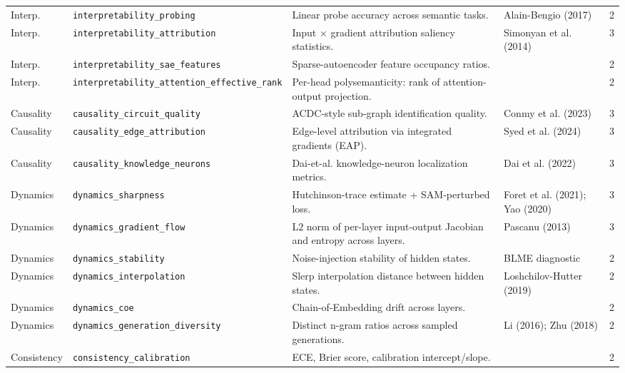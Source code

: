 \documentclass[preprint]{neurips_2025}
\begin{document}
\begin{longtable}{@{}llp{7.3cm}ll@{}}
Interp. & \texttt{interpretability\_probing} & Linear probe accuracy across semantic tasks. & Alain-Bengio (2017) & 2 \\
Interp. & \texttt{interpretability\_attribution} & Input $\times$ gradient attribution saliency statistics. & Simonyan et al. (2014) & 3 \\
Interp. & \texttt{interpretability\_sae\_features} & Sparse-autoencoder feature occupancy ratios. & \citet{templeton2024scaling} & 2 \\
Interp. & \texttt{interpretability\_attention\_effective\_rank} & Per-head polysemanticity: rank of attention-output projection. & \citet{templeton2024scaling} & 2 \\
\midrule
Causality & \texttt{causality\_circuit\_quality} & ACDC-style sub-graph identification quality. & Conmy et al. (2023) & 3 \\
Causality & \texttt{causality\_edge\_attribution} & Edge-level attribution via integrated gradients (EAP). & Syed et al. (2024) & 3 \\
Causality & \texttt{causality\_knowledge\_neurons} & Dai-et-al. knowledge-neuron localization metrics. & Dai et al. (2022) & 3 \\
\midrule
Dynamics & \texttt{dynamics\_sharpness} & Hutchinson-trace estimate + SAM-perturbed loss. & Foret et al. (2021); Yao (2020) & 3 \\
Dynamics & \texttt{dynamics\_gradient\_flow} & L$2$ norm of per-layer input-output Jacobian and entropy across layers. & Pascanu (2013) & 3 \\
Dynamics & \texttt{dynamics\_stability} & Noise-injection stability of hidden states. & BLME diagnostic & 2 \\
Dynamics & \texttt{dynamics\_interpolation} & Slerp interpolation distance between hidden states. & Loshchilov-Hutter (2019) & 2 \\
Dynamics & \texttt{dynamics\_coe} & Chain-of-Embedding drift across layers. & \citet{wang2025coe} & 2 \\
Dynamics & \texttt{dynamics\_generation\_diversity} & Distinct n-gram ratios across sampled generations. & Li (2016); Zhu (2018) & 2 \\
\midrule
Consistency & \texttt{consistency\_calibration} & ECE, Brier score, calibration intercept/slope. & \citet{guo2017calibration} & 2 \\

\end{longtable}
\end{document}
